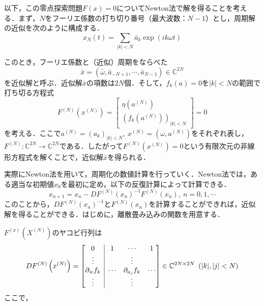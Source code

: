 \documentclass[11pt,a4paper,titlepage]{jsreport}
\theoremstyle{definition}
\begin{document}
以下，この零点探索問題$F(x)=0$についてNewton法で解を得ることを考える．まず，$N$をフーリエ係数の打ち切り番号（最大波数：$N-1$）とし，周期解の近似を次のように構成する．
\begin{equation*}
  x_N(t) = \sum_{|k|<N} \bar{a}_k \exp(ik\omega t)
\end{equation*}

このとき，フーリエ係数と（近似）周期をならべた
\begin{equation*}
  \bar{x} = \left(\bar{\omega},\bar{a}_{-N+1},\cdots,\bar{a}_{N-1}\right) \in \mathbb{C}^{2N}
\end{equation*}
を近似解と呼ぶ．近似解$\bar{x}$の項数は$2N$個．そして，$f_k(a)=0$を$|k|<N$の範囲で打ち切る方程式
\begin{equation*}
  F^{(N)}\left(x^{(N)}\right) = \begin{bmatrix}
    \eta\left(a^{(N)}\right) \\
    \left(f_k(a^{(N)})\right)_{|k|<N}
  \end{bmatrix}
  = 0
\end{equation*}
を考える．ここで$a^{(N)}=\left(a_k\right)_{|k|<N},\ x^{(N)}=\left(\omega, a^{(N)}\right)$をそれぞれ表し，$F^{(N)}:\mathbb{C}^{2N}\rightarrow\mathbb{C}^{2N}$である．したがって$F^{(N)}\left(x^{(N)}\right)=0$という有限次元の非線形方程式を解くことで，近似解$\bar{x}$を得られる．

実際にNewton法を用いて，周期化の数値計算を行っていく．Newton法では，ある適当な初期値$x_0$を最初に定め，以下の反復計算によって計算できる．
\begin{equation*}
  x_{n+1} = x_n - DF^{(N)}\left(x_n\right)^{-1} F^{(N)}\left(x_n\right),\ n=0,1,\cdots
\end{equation*}
このことから，$DF^{(N)}\left(x_n\right)^{-1}$と$F^{(N)}\left(x_n\right)$を計算することができれば，近似解を得ることができる．はじめに，離散畳み込みの関数を用意する．

$F^{(x)}(X^{(N)})$のヤコビ行列は
\begin{equation*}
  DF^{(N)}\left(x^{(N)}\right)=\begin{bmatrix}
    \multicolumn{1}{c|}{0}              & 1      & \cdots            & 1      \\
    \multicolumn{1}{c|}{\vdots}         &        & \vdots            &        \\
    \multicolumn{1}{c|}{\partial_w f_k} & \cdots & \partial_{a_j}f_k & \cdots \\
    \multicolumn{1}{c|}{\vdots}         &        & \vdots            &        \\
  \end{bmatrix} \in \mathbb{C}^{2N\times 2N}\ \left(|k|,|j|<N\right)
\end{equation*}
ここで，
\end{document}
